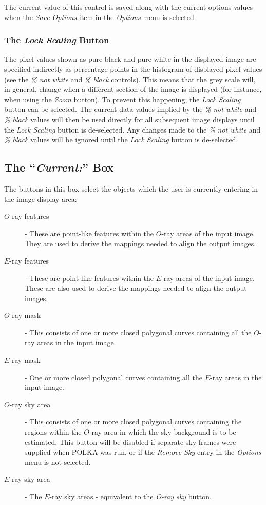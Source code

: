 \documentclass[11pt]{article}
\newcommand{\htmlref}[2]{#1}
\newcommand{\xlabel}[1]{}
\newcommand{\mylabel}[1] {\xlabel{#1}\label{#1}}
\begin{document}
The current value of this control is saved along with the current options
values when the \htmlref{\emph{Save Options}}{POLKA_SAVE_OPTIONS} item in
the \htmlref{\emph{Options}}{POLKA_OPTIONS_MENU} menu is selected.

\subsubsection {\mylabel{POLKA_LOCK_SCALING}The \emph{Lock Scaling} Button}
The pixel values shown as pure black and pure white in the displayed
image are specified indirectly as percentage points in the histogram of
displayed pixel values (see the \htmlref{\emph{\% not
white}}{POLKA_WHITE} and \htmlref{\emph{\% black}}{POLKA_BLACK}
controls). This means that the grey scale will, in general, change when a
different section of the image is displayed (for instance, when using the
\htmlref{\emph{Zoom}}{POLKA_ZOOM} button). To prevent this happening, the
\emph{Lock Scaling} button can be selected. The current data values
implied by the \htmlref{\emph{\% not white}}{POLKA_WHITE} and
\htmlref{\emph{\% black}}{POLKA_BLACK} values will then be used
directly for all subsequent image displays until the \emph{Lock Scaling}
button is de-selected. Any changes made to the \htmlref{\emph{\% not
white}}{POLKA_WHITE} and \htmlref{\emph{\% black}}{POLKA_BLACK}
values will be ignored until the \emph{Lock Scaling} button is
de-selected.

\subsection {\mylabel{POLKA_CURRENT}The ``\emph{Current:}'' Box}
The buttons in this box select the objects which the user is currently
entering in the \htmlref{image display area}{POLKA_IMAGE_DISPLAY}:

\begin{description}
\item [$O$-ray features] - These are point-like features within the
$O$-ray areas of the input image. They are used to derive the mappings
needed to align the output images.
\item [$E$-ray features] - These are point-like features within the
$E$-ray areas of the input image. These are also used to derive the mappings
needed to align the output images.
\item [$O$-ray mask] - This consists of one or more closed polygonal curves
containing all the $O$-ray areas in the input image.
\item [$E$-ray mask] - One or more closed polygonal curves
containing all the $E$-ray areas in the input image.
\item [$O$-ray sky area] - This consists of one or more closed polygonal curves
containing the regions within the $O$-ray area in which the sky
background is to be estimated. This button will be disabled if
separate sky frames were supplied when POLKA was run, or if the
\htmlref{\emph{Remove Sky}}{POLKA_REMOVE_SKY} entry in the \htmlref{{\em
Options}}{POLKA_OPTIONS_MENU} menu is not selected.
\item [$E$-ray sky area] - The $E$-ray sky areas - equivalent to the
\emph{O-ray sky} button.
\end{description}
\end{document}
